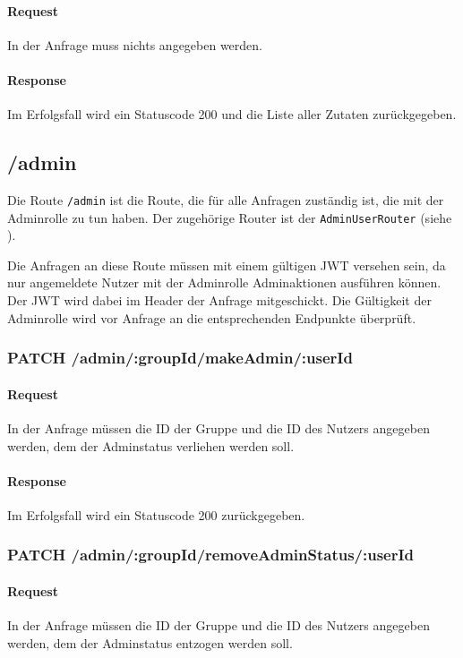 \documentclass{entwurfsheft}
\begin{document}
\paragraph{Request}
In der Anfrage muss nichts angegeben werden.
\paragraph{Response}
Im Erfolgsfall wird ein Statuscode 200 und die Liste aller Zutaten zurückgegeben.

\subsection{/admin}
Die Route \texttt{/admin} ist die Route, die für alle Anfragen zuständig ist, die mit der Adminrolle zu tun haben.
Der zugehörige Router ist der \texttt{AdminUserRouter} (siehe ).

Die Anfragen an diese Route müssen mit einem gültigen JWT versehen sein, da nur angemeldete Nutzer mit der Adminrolle Adminaktionen ausführen können.
Der JWT wird dabei im Header der Anfrage mitgeschickt.
Die Gültigkeit der Adminrolle wird vor Anfrage an die entsprechenden Endpunkte überprüft.

\subsubsection*{PATCH /admin/:groupId/makeAdmin/:userId}
\paragraph{Request}
In der Anfrage müssen die ID der Gruppe und die ID des Nutzers angegeben werden, dem der Adminstatus verliehen werden soll.
\paragraph{Response}
Im Erfolgsfall wird ein Statuscode 200 zurückgegeben.

\subsubsection*{PATCH /admin/:groupId/removeAdminStatus/:userId}
\paragraph{Request}
In der Anfrage müssen die ID der Gruppe und die ID des Nutzers angegeben werden, dem der Adminstatus entzogen werden soll.
\end{document}
